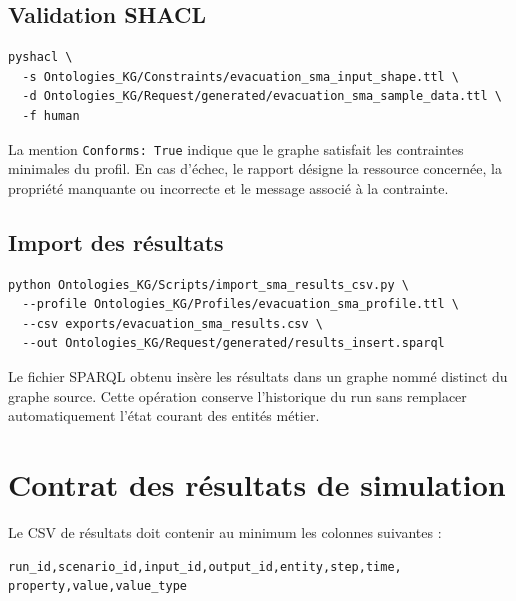 \documentclass{article}
\begin{document}
\subsection{Validation SHACL}

\begin{lstlisting}
pyshacl \
  -s Ontologies_KG/Constraints/evacuation_sma_input_shape.ttl \
  -d Ontologies_KG/Request/generated/evacuation_sma_sample_data.ttl \
  -f human
\end{lstlisting}

La mention \texttt{Conforms: True} indique que le graphe satisfait les contraintes minimales du profil. En cas d'échec, le rapport désigne la ressource concernée, la propriété manquante ou incorrecte et le message associé à la contrainte.

\subsection{Import des résultats}

\begin{lstlisting}
python Ontologies_KG/Scripts/import_sma_results_csv.py \
  --profile Ontologies_KG/Profiles/evacuation_sma_profile.ttl \
  --csv exports/evacuation_sma_results.csv \
  --out Ontologies_KG/Request/generated/results_insert.sparql
\end{lstlisting}

Le fichier SPARQL obtenu insère les résultats dans un graphe nommé distinct du graphe source. Cette opération conserve l'historique du run sans remplacer automatiquement l'état courant des entités métier.

\clearpage
\section{Contrat des résultats de simulation}

Le CSV de résultats doit contenir au minimum les colonnes suivantes :

\begin{lstlisting}
run_id,scenario_id,input_id,output_id,entity,step,time,
property,value,value_type
\end{lstlisting}
\end{document}
